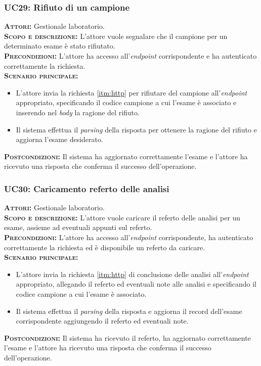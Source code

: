 \subsubsection{UC29: Rifiuto di un campione}
\label{sec:UC29}
\textsc{\textbf{Attori:}} Gestionale laboratorio.\\
\textsc{\textbf{Scopo e descrizione:}} L'attore vuole segnalare che il campione per un determinato esame è stato rifiutato.\\
\textsc{\textsc{\textbf{Precondizioni:}}} L'attore ha accesso all'\textit{endpoint} corrispondente e ha autenticato correttamente la richiesta.\\
\textsc{\textbf{Scenario principale:}}  
\begin{itemize}
    \item L'attore invia la richiesta \ref{itm:http} per rifiutare del campione all'\textit{endpoint} appropriato, specificando il codice campione a cui l'esame è associato e inserendo nel \textit{body} la ragione del rifiuto.
    \item Il sistema effettua il \textit{parsing} della risposta per ottenere la ragione del rifiuto e aggiorna l'esame desiderato.
\end{itemize}
\textsc{\textbf{Postcondizioni:}} Il sistema ha aggiornato correttamente l'esame e l'attore ha ricevuto una risposta che conferma il successo dell'operazione.

\subsubsection{UC30: Caricamento referto delle analisi}
\label{sec:UC30}
\textsc{\textbf{Attori:}} Gestionale laboratorio.\\
\textsc{\textbf{Scopo e descrizione:}} L'attore vuole caricare il referto delle analisi per un esame, assieme ad eventuali appunti sul referto.\\
\textsc{\textsc{\textbf{Precondizioni:}}} L'attore ha accesso all'\textit{endpoint} corrispondente, ha autenticato correttamente la richiesta ed è disponibile un referto da caricare.\\
\textsc{\textbf{Scenario principale:}}  \begin{itemize}
    \item L'attore invia la richiesta \ref{itm:http} di conclusione delle analisi all'\textit{endpoint} appropriato, allegando il referto ed eventuali note alle analisi e specificando il codice campione a cui l'esame è associato.
    \item Il sistema effettua il \textit{parsing} della risposta e aggiorna il record dell'esame corrispondente aggiungendo il referto ed eventuali note.
\end{itemize}
\textsc{\textbf{Postcondizioni:}} Il sistema ha ricevuto il referto, ha aggiornato correttamente l'esame e l'attore ha ricevuto una risposta che conferma il successo dell'operazione.

